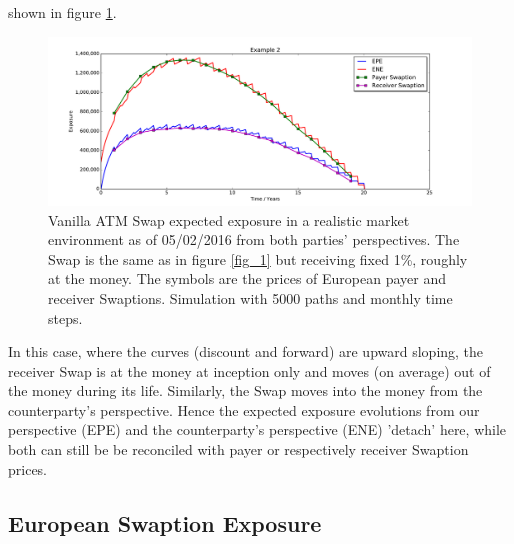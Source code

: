 \documentclass[12pt, a4paper]{article}
\begin{document}
shown in figure \ref{fig_2}.
\begin{figure}[h!]
\begin{center}
\includegraphics[scale=0.45]{mpl_swap_3.pdf}
\end{center}
\caption{Vanilla ATM Swap expected exposure in a realistic market environment as of 05/02/2016 from both parties'
  perspectives. The Swap is the same as in figure \ref{fig_1} but receiving fixed 1\%, roughly at the money. The symbols
  are the prices of European payer and receiver Swaptions. Simulation with 5000 paths and monthly time steps.}
\label{fig_2}
\end{figure}
In this case, where the curves (discount and forward) are upward sloping, the receiver Swap is at the money at inception
only and moves (on average) out of the money during its life. Similarly, the Swap moves into the money from the
counterparty's perspective. Hence the expected exposure evolutions from our perspective (EPE) and the counterparty's
perspective (ENE) 'detach' here, while both can still be be reconciled with payer or respectively receiver Swaption
prices.

\subsection{European Swaption Exposure}\label{sec:european_swaption}
\end{document}
